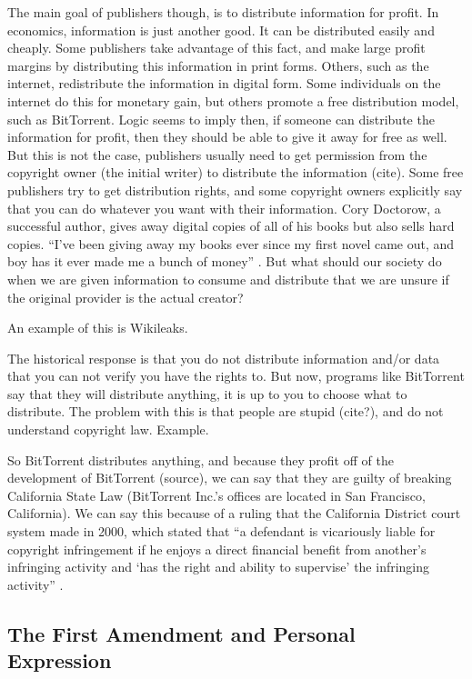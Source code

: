 \documentclass[11pt]{article}
\begin{document}
The main goal of publishers though, is to distribute information for profit. In economics, information is just another good. It can be distributed easily and cheaply. Some publishers take advantage of this fact, and make large profit margins\cite{PSO} by distributing this information in print forms. Others, such as the internet, redistribute the information in digital form. Some individuals on the internet do this for monetary gain, but others promote a free distribution model, such as BitTorrent. Logic seems to imply then, if someone can distribute the information for profit, then they should be able to give it away for free as well. But this is not the case, publishers usually need to get permission from the copyright owner (the initial writer) to distribute the information (cite). Some free publishers try to get distribution rights, and some copyright owners explicitly say that you can do whatever you want with their information. Cory Doctorow, a successful author, gives away digital copies of all of his books but also sells hard copies. ``I've been giving away my books ever since my first novel came out, and boy has it ever made me a bunch of money'' \cite{doctorow}. But what should our society do when we are given information to consume and distribute that we are unsure if the original provider is the actual creator?

An example of this is Wikileaks.

The historical response is that you do not distribute information and/or data that you can not verify you have the rights to. But now, programs like BitTorrent say that they will distribute anything, it is up to you to choose what to distribute. The problem with this is that people are stupid (cite?), and do not understand copyright law. Example.

So BitTorrent distributes anything, and because they profit off of the development of BitTorrent (source), we can say that they are guilty of breaking California State Law (BitTorrent Inc.'s offices are located in San Francisco, California). We can say this because of a ruling that the California District court system made in 2000, which stated that ``a defendant is vicariously liable for copyright infringement if he enjoys a direct financial benefit from another's infringing activity and `has the right and ability to supervise' the infringing activity'' \cite{2000m}.

\subsection{The First Amendment and Personal Expression}
\end{document}
